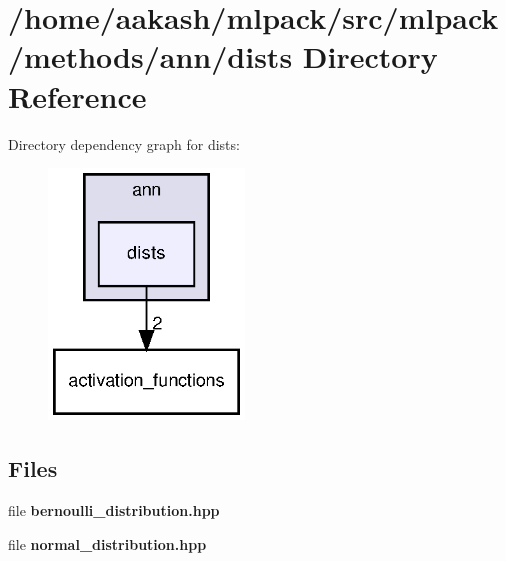 \section{/home/aakash/mlpack/src/mlpack/methods/ann/dists Directory Reference}
\label{dir_7d6dd27c639cf7af5570705c13ad6f70}
Directory dependency graph for dists\+:
\nopagebreak
\begin{figure}[H]
\begin{center}
\leavevmode
\includegraphics[width=148pt]{dir_7d6dd27c639cf7af5570705c13ad6f70_dep}
\end{center}
\end{figure}
\subsection*{Files}
\begin{DoxyCompactItemize}
\item 
file \textbf{ bernoulli\+\_\+distribution.\+hpp}
\item 
file \textbf{ normal\+\_\+distribution.\+hpp}
\end{DoxyCompactItemize}
